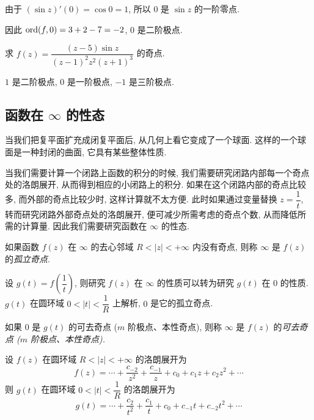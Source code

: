 \begin{solution}
		由于 $(\sin z)'(0)=\cos 0=1$, 所以 $0$ 是 $\sin z$ 的一阶零点.

	{因此 ${\mathrm{ord}}(f,0)=3+2-7=-2$, $0$ 是二阶极点.
	}
\end{solution}

\begin{exercise}
	求 $f(z)=\dfrac{(z-5)\sin z}{(z-1)^2z^2(z+1)^3}$ 的奇点.
\end{exercise}

\begin{answer}
	$1$ 是二阶极点, $0$ 是一阶极点, $-1$ 是三阶极点.
\end{answer}

\subsection{函数在 \texorpdfstring{$\infty$}{∞} 的性态}

当我们把复平面扩充成闭复平面后, 从几何上看它变成了一个球面.
这样的一个球面是一种封闭的曲面, 它具有某些整体性质.

当我们需要计算一个闭路上函数的积分的时候,
我们需要研究闭路内部每一个奇点处的洛朗展开,
从而得到相应的小闭路上的积分.
如果在这个闭路内部的奇点比较多, 而外部的奇点比较少时, 这样计算就不太方便.
此时如果通过变量替换 $z=\dfrac1t$, 转而研究闭路外部奇点处的洛朗展开,
便可减少所需考虑的奇点个数, 从而降低所需的计算量.
因此我们需要研究函数在 $\infty$ 的性态.

\begin{definition}
	如果函数 $f(z)$ 在 $\infty$ 的去心邻域 $R<|z|<+\infty$ 内没有奇点, 则称 $\infty$ 是 $f(z)$ 的\emph{孤立奇点}.
\end{definition}

设 $g(t)=f\left(\dfrac1t\right)$, 则研究 $f(z)$ 在 $\infty$ 的性质可以转为研究 $g(t)$ 在 $0$ 的性质.
$g(t)$ 在圆环域 $0<|t|<\dfrac1R$ 上解析, $0$ 是它的孤立奇点.

\begin{definition}
	如果 $0$ 是 $g(t)$ 的可去奇点 ($m$ 阶极点、本性奇点), 则称 $\infty$ 是 $f(z)$ 的\emph{可去奇点 ($m$ 阶极点、本性奇点).}
\end{definition}

设 $f(z)$ 在圆环域 $R<|z|<+\infty$ 的洛朗展开为
\[f(z)=\cdots+\frac{c_{-2}}{z^2}+\frac{c_{-1}}{z}+c_0+c_1z+c_2z^2+\cdots\]
则 $g(t)$ 在圆环域 $0<|t|<\dfrac1R$ 的洛朗展开为
\[g(t)=\cdots+\frac{c_2}{t^2}+\frac{c_1}t+c_0+c_{-1}t+c_{-2}t^2+\cdots\]

